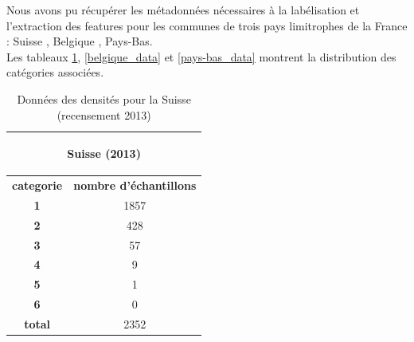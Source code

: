 \documentclass{book}
\begin{document}
Nous avons pu récupérer les métadonnées nécessaires à la labélisation et l'extraction des features pour les communes de trois pays limitrophes de la France : Suisse \cite{suisse}, Belgique \cite{belgique}, Pays-Bas\cite{pays-bas}.\\
Les tableaux \ref{suisse_data}, \ref{belgique_data} et \ref{pays-bas_data} montrent la distribution des catégories associées.

   \begin{table}[H]
   \begin{center}
   \begin{adjustbox}{max width=0.5\textwidth}
    \begin{tabular}{|c|c|}
      \hline
      \multicolumn{2}{|c|}{\begin{bf}Suisse (2013)\end{bf}} \\
      \hline
      \textbf{categorie} & \textbf{nombre d'échantillons}\\
      \hline
      \textbf{1} & 1857\\
      \hline
      \textbf{2} & 428\\
      \hline
      \textbf{3} & 57\\
      \hline
      \textbf{4} & 9\\
      \hline
      \textbf{5} & 1\\
      \hline
      \textbf{6} & 0 \\
      \hline
      \textbf{total} & 2352\\
      \hline
    \end{tabular}
   \end{adjustbox}
   \caption{Données des densités pour la Suisse (recensement 2013)}
   \label{suisse_data}
   \end{center}
   \end{table}
\end{document}
